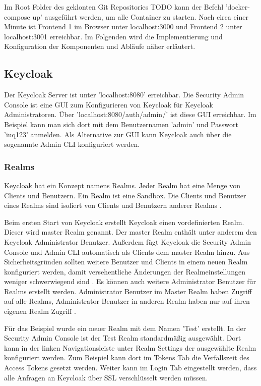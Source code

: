 Im Root Folder des geklonten Git Repositories TODO kann der Befehl 'docker-compose up' ausgeführt werden, um alle Container zu starten. Nach circa einer Minute ist Frontend 1 im Browser unter localhost:3000 und Frontend 2 unter localhost:3001 erreichbar. Im Folgenden wird die Implementierung und Konfiguration der Komponenten und Abläufe näher erläutert.

\subsection{Keycloak}

Der Keycloak Server ist unter 'localhost:8080' erreichbar. Die Security Admin Console ist eine GUI zum Konfigurieren von Keycloak für Keycloak Administratoren. Über 'localhost:8080/auth/admin/' ist diese GUI erreichbar. Im Beispiel kann man sich dort mit dem Benutzernamen 'admin' und Passwort 'iuq123' anmelden. Als Alternative zur GUI kann Keycloak auch über die sogenannte Admin CLI konfiguriert werden.

\subsubsection{Realms}

Keycloak hat ein Konzept namens Realms. Jeder Realm hat eine Menge von Clients und Benutzern. Ein Realm ist eine Sandbox. Die Clients und Benutzer eines Realms sind isoliert von Clients und Benutzern anderer Realms \cite{EB46}.

Beim ersten Start von Keycloak erstellt Keycloak einen vordefinierten Realm. Dieser wird master Realm genannt. Der master Realm enthält unter anderem den Keycloak Administrator Benutzer. Außerdem fügt Keycloak die Security Admin Console und Admin CLI automatisch als Clients dem master Realm hinzu. Aus Sicherheitsgründen sollten weitere Benutzer und Clients in einem neuen Realm konfiguriert werden, damit versehentliche Änderungen der Realmeinstellungen weniger schwerwiegend sind \cite{EB47}. Es können auch weitere Administrator Benutzer für Realms erstellt werden. Administrator Benutzer im Master Realm haben Zugriff auf alle Realms,  Administrator Benutzer in anderen Realm haben nur auf ihren eigenen Realm Zugriff \cite{EB47}.

Für das Beispiel wurde ein neuer Realm mit dem Namen 'Test' erstellt. In der Security Admin Console ist der Test Realm standardmäßig ausgewählt. Dort kann in der linken Navigationsleiste unter Realm Settings der ausgewählte Realm konfiguriert werden. Zum Beispiel kann dort im Tokens Tab die Verfallszeit des Access Tokens gesetzt werden. Weiter kann im Login Tab eingestellt werden, dass alle Anfragen an Keycloak über SSL verschlüsselt werden müssen. %

